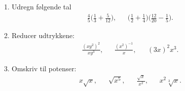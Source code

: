 \begin{enumerate}
\item Udregn følgende tal
\begin{align*}
\frac{4}{5}\Big(\frac{1}{3}+\frac{5}{12}\Big),&&\Big(\frac{1}{2}+\frac{1}{4}\Big)\Big(\frac{12}{20}-\frac{1}{5}\Big).
\end{align*}

\item Reducer udtrykkene:
\begin{align*}
\frac{(xy^2)^2}{xy^3},&& \frac{(x^2)^{-1}}{x},&& (3x)^2x^3.
\end{align*}




\item Omskriv til potenser:
\begin{align*}
x\sqrt{x},&& \sqrt{x^5},&& \frac{\sqrt{x}}{x^2},&& x^2\sqrt[3]{x}.
\end{align*}



















\end{enumerate}


